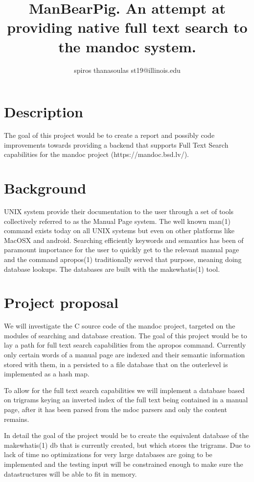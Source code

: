 \documentclass{report}
\begin{document}
\title{ManBearPig. An attempt at providing native full text search to the mandoc system.}
\author{spiros thanasoulas st19@illinois.edu}
\maketitle

\section*{Description}
The goal of this project would be to create a report and possibly code improvements towards providing
a backend that supports Full Text Search capabilities for the mandoc project (https://mandoc.bsd.lv/).

\section*{Background}
UNIX system provide their documentation to the user through a set of tools collectively referred to
as the Manual Page system. The well known man(1) command exists today on all UNIX systems but even
on other platforms like MacOSX and android. Searching efficiently keywords and semantics has been
of paramount importance for the user to quickly get to the relevant manual page and the command
apropos(1) traditionally served that purpose, meaning doing database lookups. 
The databases are built with the makewhatis(1) tool.

\section*{Project proposal}
We will investigate the C source code of the mandoc project, targeted on the modules of searching
and database creation. The goal of this project would be to lay a path for full text search capabilities
from the apropos command. Currently only certain words of a manual page are indexed and their semantic
information stored with them, in a persisted to a file database that on the outerlevel is implemented as 
a hash map.

To allow for the full text search capabilities we will implement a database based on trigrams keying an
inverted index  of the full text being contained in a manual page, 
after it has been parsed from the mdoc parsers and only the content remains.

In detail the goal of the project would be to create the equivalent database of the makewhatis(1) db that
is currently created, but which stores the trigrams. Due to lack of time no optimizations for very large
databases are going to be implemented and the testing input will be constrained enough to make sure 
the datastructures will be able to fit in memory.
\end{document}
